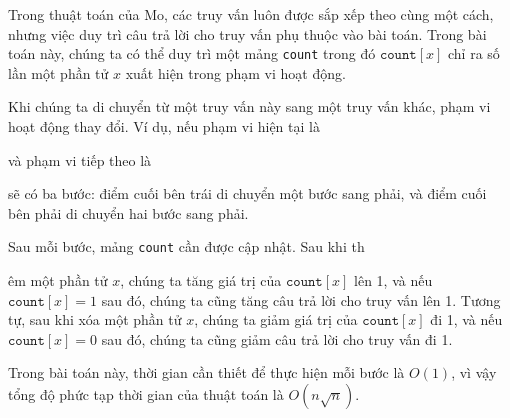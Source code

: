Trong thuật toán của Mo, các truy vấn luôn được sắp xếp
theo cùng một cách, nhưng việc
duy trì câu trả lời cho truy vấn phụ thuộc vào bài toán.
Trong bài toán này, chúng ta có thể duy trì một mảng 
\texttt{count} trong đó $\texttt{count}[x]$
chỉ ra số lần một phần tử $x$
xuất hiện trong phạm vi hoạt động.

Khi chúng ta di chuyển từ một truy vấn này sang một truy vấn khác,
phạm vi hoạt động thay đổi.
Ví dụ, nếu phạm vi hiện tại là
\begin{center}
\end{center}
và phạm vi tiếp theo là
\begin{center}
\end{center}
sẽ có ba bước:
điểm cuối bên trái di chuyển một bước sang phải,
và điểm cuối bên phải di chuyển hai bước sang phải.

Sau mỗi bước, mảng \texttt{count}
cần được cập nhật.
Sau khi th

êm một phần tử $x$,
chúng ta tăng giá trị của 
$\texttt{count}[x]$ lên 1,
và nếu $\texttt{count}[x]=1$ sau đó,
chúng ta cũng tăng câu trả lời cho truy vấn lên 1.
Tương tự, sau khi xóa một phần tử $x$,
chúng ta giảm giá trị của 
$\texttt{count}[x]$ đi 1,
và nếu $\texttt{count}[x]=0$ sau đó,
chúng ta cũng giảm câu trả lời cho truy vấn đi 1.

Trong bài toán này, thời gian cần thiết để thực hiện
mỗi bước là $O(1)$, vì vậy tổng độ phức tạp thời gian
của thuật toán là $O(n \sqrt n)$.